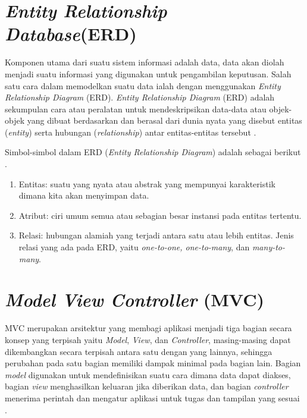 \section{\emph{Entity Relationship Database}(ERD)}

Komponen utama dari suatu sistem informasi adalah data, data akan diolah menjadi suatu informasi yang digunakan untuk pengambilan keputusan. Salah satu cara dalam memodelkan suatu data ialah dengan menggunakan \textit{Entity Relationship Diagram} (ERD).\textit{ Entity Relationship Diagram} (ERD) adalah sekumpulan cara atau peralatan untuk mendeskripsikan data-data atau objek-objek yang dibuat berdasarkan dan berasal dari dunia nyata yang disebut entitas (\textit{entity}) serta hubungan (\textit{relationship}) antar entitas-entitas tersebut \cite{DoroEdi}. 

Simbol-simbol dalam ERD (\textit{Entity Relationship Diagram}) adalah sebagai berikut \cite{Fridayanthie}.
\begin{enumerate}
	\item Entitas: suatu yang nyata atau abstrak yang mempunyai karakteristik dimana kita akan menyimpan data.
	\item Atribut: ciri umum semua atau sebagian besar instansi pada entitas tertentu.
	\item Relasi: hubungan alamiah yang terjadi antara satu atau lebih entitas. Jenis relasi yang ada pada ERD, yaitu \textit{one-to-one, one-to-many}, dan\textit{ many-to-many}.
	
\end{enumerate}



\section{\emph{Model View Controller} (MVC)}

MVC merupakan arsitektur yang membagi aplikasi menjadi tiga bagian secara konsep yang terpisah yaitu \textit{Model}, \textit{View}, dan \textit{Controller}, masing-masing dapat dikembangkan secara terpisah antara satu dengan yang lainnya, sehingga perubahan pada satu bagian memiliki dampak minimal pada bagian lain. Bagian \textit{model} digunakan untuk mendefinisikan suatu cara dimana data dapat diakses, bagian \textit{view} menghasilkan keluaran jika diberikan data, dan bagian \textit{controller} menerima perintah dan mengatur aplikasi untuk tugas dan tampilan yang sesuai \cite{AriefHidayat}. 

